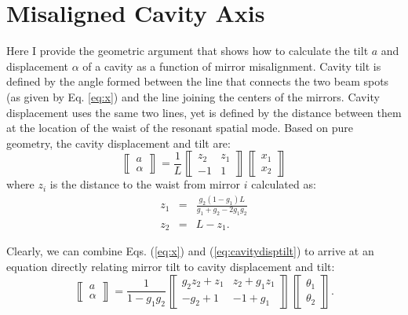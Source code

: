 \section{Misaligned Cavity Axis}
\label{sec:misaligned_cavity}
Here I provide the geometric argument that shows how to calculate the
tilt $a$ and displacement $\alpha$ of a cavity as a function of mirror
misalignment. Cavity tilt is defined by the angle formed between
the line that connects the two beam spots (as given by Eq. \ref{eq:x}) and the line joining the
centers of the mirrors. Cavity displacement uses the same two lines,
yet is defined by the distance between them at the location of the
waist of the resonant spatial mode. Based on pure geometry, the cavity
displacement and tilt are:
\begin{equation}
\left\llbracket \begin{array}{c}
a \\
\alpha \end{array} \right\rrbracket = \frac{1}{L}
\left\llbracket \begin{array}{cc}
z_2 & z_1\\
-1 & 1\end{array} \right\rrbracket
\left\llbracket \begin{array}{c}
x_1\\
x_2 \end{array} \right\rrbracket
\label{eq:cavitydisptilt}
\end{equation}
where $z_i$ is the distance to the waist from mirror $i$ calculated as:
\begin{eqnarray}
z_1 &=& \frac{g_2 (1-g_1) L}{g_1+g_2 - 2 g_1g_2} \\
z_2 &=& L - z_1.
\end{eqnarray}

Clearly, we can combine Eqs. (\ref{eq:x}) and
(\ref{eq:cavitydisptilt}) to arrive at an equation directly relating
mirror tilt to cavity displacement and tilt: 
\begin{equation}
\left\llbracket \begin{array}{c}
a \\
\alpha \end{array} \right\rrbracket = \frac{1}{1-g_1g_2}
\left\llbracket \begin{array}{cc}
g_2z_2 + z_1 & z_2 + g_1z_1\\
-g_2 + 1 & -1 + g_1\end{array} \right\rrbracket
\left\llbracket \begin{array}{c}
\theta_1\\
\theta_2 \end{array} \right\rrbracket.
\label{eq:cavitydisptilt_mirrorangle}
\end{equation}



